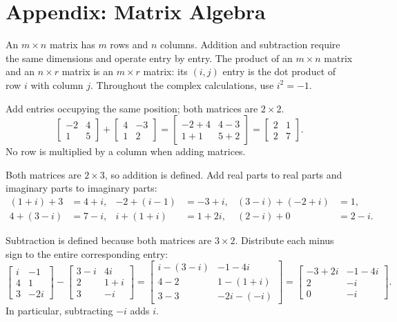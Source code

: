 \section{Appendix: Matrix Algebra}

An $m\times n$ matrix has $m$ rows and $n$ columns. Addition and subtraction
require the same dimensions and operate entry by entry. The product of an
$m\times n$ matrix and an $n\times r$ matrix is an $m\times r$ matrix:
its $(i,j)$ entry is the dot product of row $i$ with column $j$.
Throughout the complex calculations, use $i^2=-1$.

\idea Add entries occupying the same position; both matrices are $2\times2$.
\[
\begin{bmatrix}-2&4\\1&5\end{bmatrix}+
\begin{bmatrix}4&-3\\1&2\end{bmatrix}
=\begin{bmatrix}-2+4&4-3\\1+1&5+2\end{bmatrix}
=\boxed{\begin{bmatrix}2&1\\2&7\end{bmatrix}}.
\]
No row is multiplied by a column when adding matrices.

Both matrices are $2\times3$, so addition is defined. Add real parts to real
parts and imaginary parts to imaginary parts:
\begin{align*}
(1+i)+3&=4+i,& -2+(i-1)&=-3+i,&(3-i)+(-2+i)&=1,\\
4+(3-i)&=7-i,&i+(1+i)&=1+2i,&(2-i)+0&=2-i.
\end{align*}

Subtraction is defined because both matrices are $3\times2$. Distribute each
minus sign to the entire corresponding entry:
\[
\begin{bmatrix}i&-1\\4&1\\3&-2i\end{bmatrix}-
\begin{bmatrix}3-i&4i\\2&1+i\\3&-i\end{bmatrix}
=\begin{bmatrix}i-(3-i)&-1-4i\\4-2&1-(1+i)\\3-3&-2i-(-i)\end{bmatrix}
=\boxed{\begin{bmatrix}-3+2i&-1-4i\\2&-i\\0&-i\end{bmatrix}}.
\]
In particular, subtracting $-i$ adds $i$.

